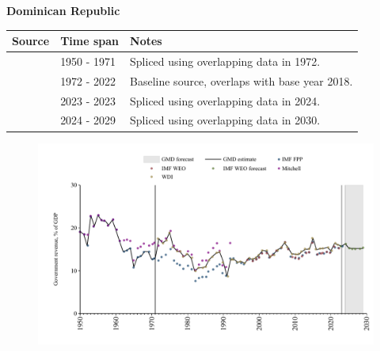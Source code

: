 \documentclass[12pt,a4paper,landscape]{article}
\begin{document}
\begin{adjustbox}{max totalsize={\paperwidth}{\paperheight},center}
\begin{minipage}[t][\textheight][t]{\textwidth}
\vspace*{0.5cm}
{}
\begin{center}
{\Large\bfseries Dominican Republic}
\end{center}
\vspace{0.5cm}
\begin{table}[H]
\centering
\small
\begin{tabular}{|l|l|l|}
\hline
\textbf{Source} & \textbf{Time span} & \textbf{Notes} \\
\hline
\rowcolor{white}\cite{IMF_FPP}& 1950 - 1971 &Spliced using overlapping data in 1972.\\
\rowcolor{lightgray}\cite{WDI}& 1972 - 2022 &Baseline source, overlaps with base year 2018.\\
\rowcolor{white}\cite{IMF_FPP}& 2023 - 2023 &Spliced using overlapping data in 2024.\\
\rowcolor{lightgray}\cite{IMF_WEO_forecast}& 2024 - 2029 &Spliced using overlapping data in 2030.\\
\hline
\end{tabular}
\end{table}
\begin{figure}[H]
\centering
\includegraphics[width=\textwidth,height=0.6\textheight,keepaspectratio]{graphs/DOM_govrev_GDP.pdf}
\end{figure}
\end{minipage}
\end{adjustbox}
\end{document}
